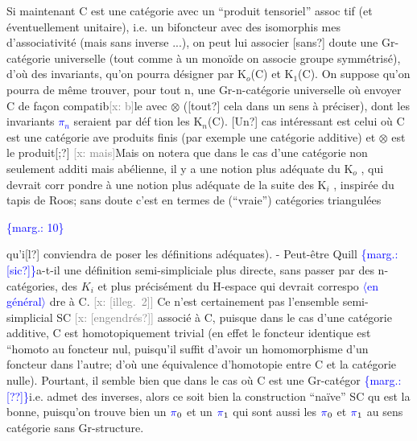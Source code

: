 \documentclass[11pt]{article}
\newcommand{\scanpage}[1]{\par\bigskip\noindent{\small\sffamily[scan #1]}\par}
\newcommand{\mspage}[1]{{\small\sffamily[p.\,#1]}}
\newcommand{\hand}[1]{\textcolor{blue}{#1}}
\let\over\relax
\newcommand{\over}[2]{\textcolor{gray}{#1}\textcolor{blue}{\ensuremath{^{\!\nearrow}}#2}}
\newcommand{\inserted}[2][]{\textcolor{blue}{$\langle$#2$\rangle$}}
\newcommand{\margin}[1]{\textcolor{blue}{\{\textsf{marg.:} #1\}}}
\newcommand{\xout}[1]{\textcolor{gray}{[\textsf{x:} #1]}}
\newcommand{\unsure}[1]{[#1?]}
\newcommand{\illegible}[1]{[\textsf{illeg.\ #1}]}
\begin{document}
Si maintenant C est une catégorie avec un ``produit tensoriel'' assoc
tif (et éventuellement unitaire), i.e. un bifoncteur avec des isomorphis
mes d'associativité (mais sans inverse ...), on peut lui associer \unsure{sans}
doute une  Gr-catégorie universelle (tout comme à un monoïde on associe
groupe symmétrisé), d'où des invariants, qu'on pourra désigner par K$_{o}$(C)
et K$_{1}$(C). On suppose qu'on pourra de même trouver, pour tout n, une
Gr-n-catégorie universelle où envoyer C de façon compatib\xout{b}le avec $\otimes$ (\unsure{tout}
cela dans un sens à préciser), dont les invariants \hand{$\pi_n$}  seraient par déf
tion les K$_{n}$(C). \unsure{Un} cas intéressant est celui où C est une catégorie ave
produits finis (par exemple une catégorie additive) et $\otimes$ est le produit\unsure{;}
\xout{mais}\over{(}{[}Mais on notera que dans le cas d'une catégorie non seulement additi
mais abélienne, il y a une notion plus adéquate du K$_{o}$ , qui devrait corr
pondre à une notion plus adéquate de la suite des K$_{i}$ , inspirée du tapis
de Roos; sans doute c'est en termes de (``vraie'') catégories triangulées

\margin{10}

\clearpage
\scanpage{162-5/11}
\mspage{10}

qu'i\unsure{l} conviendra de poser les définitions adéquates). - Peut-être Quill
\margin{\unsure{sic}}a-t-il une définition semi-simpliciale plus directe, sans passer par des
n-catégories, des $K_i$ et plus précisément du H-espace qui devrait correspo
\inserted[typed]{en général}
dre à C. \xout{\illegible{2}} Ce n'est certainement pas l'ensemble semi-simplicial
SC \xout{\unsure{engendrés}} associé à C, puisque dans le cas d'une catégorie additive,
C est homotopiquement trivial (en effet le foncteur identique est ``homoto
au foncteur nul, puisqu'il suffit d'avoir un homomorphisme d'un foncteur
dans l'autre; d'où une équivalence d'homotopie entre C et la catégorie
nulle). Pourtant, il semble bien que dans le cas où C est une Gr-catégor
\margin{\unsure{?}}i.e. admet des inverses, alors ce soit bien la construction ``naïve'' SC qu
est la bonne, puisqu'on trouve bien un $\hand{\pi}_0$ et un $\hand{\pi}_1$ qui sont aussi les
$\hand{\pi}_0$ et $\hand{\pi}_1$ au sens catégorie sans Gr-structure.
\end{document}
